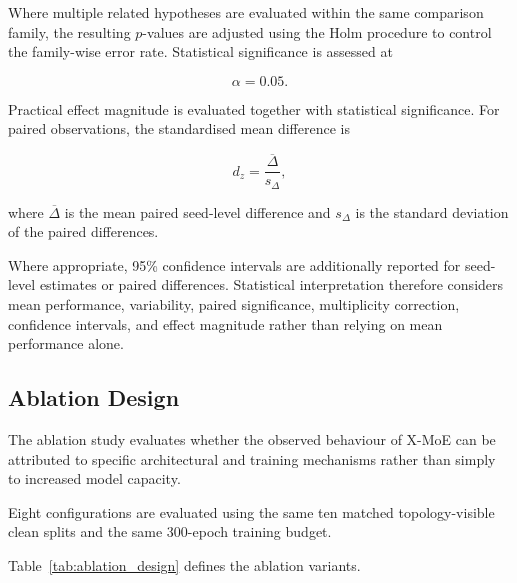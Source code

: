 \documentclass{ieeeaccess}
\begin{document}
Where multiple related hypotheses are evaluated within the same comparison family, the resulting \(p\)-values are adjusted using the Holm procedure to control the family-wise error rate. Statistical significance is assessed at

\begin{equation}
\alpha=0.05.
\end{equation}

Practical effect magnitude is evaluated together with statistical significance. For paired observations, the standardised mean difference is

\begin{equation}
d_z
=
\frac{\overline{\Delta}}
{s_{\Delta}},
\label{eq:dz}
\end{equation}

where \(\overline{\Delta}\) is the mean paired seed-level difference and \(s_{\Delta}\) is the standard deviation of the paired differences.

Where appropriate, 95\% confidence intervals are additionally reported for seed-level estimates or paired differences. Statistical interpretation therefore considers mean performance, variability, paired significance, multiplicity correction, confidence intervals, and effect magnitude rather than relying on mean performance alone.


\subsection{Ablation Design}

The ablation study evaluates whether the observed behaviour of X-MoE can be attributed to specific architectural and training mechanisms rather than simply to increased model capacity.

Eight configurations are evaluated using the same ten matched topology-visible clean splits and the same 300-epoch training budget.

Table~\ref{tab:ablation_design} defines the ablation variants.
\end{document}
